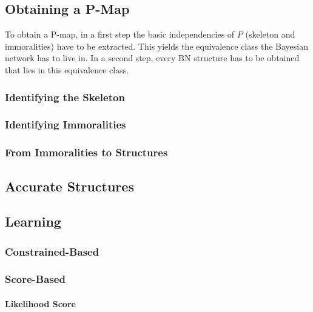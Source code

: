 		\subsection{Obtaining a P-Map} %
			To obtain a P-map, in a first step the basic independencies of \(P\) (skeleton and immoralities) have to be extracted. This yields the equivalence class the Bayesian network has to live in. In a second step, every BN structure has to be obtained that lies in this equivalence class.


			\subsubsection{Identifying the Skeleton} %

			\subsubsection{Identifying Immoralities} %

			\subsubsection{From Immoralities to Structures} %

		\subsection{Accurate Structures} %

		\subsection{Learning} %

			\subsubsection{Constrained-Based} %

			\subsubsection{Score-Based} %

				\paragraph{Likelihood Score} %

